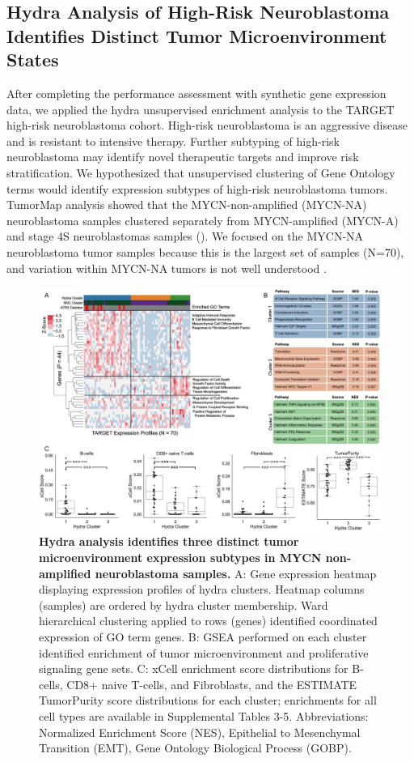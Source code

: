 \documentclass[10pt,letterpaper]{article}
\begin{document}
\subsection{Hydra Analysis of High-Risk Neuroblastoma Identifies Distinct Tumor Microenvironment States}
After completing the performance assessment with synthetic gene expression data, we applied the hydra unsupervised enrichment analysis to the TARGET high-risk neuroblastoma cohort. High-risk neuroblastoma is an aggressive disease and is resistant to intensive therapy. Further subtyping of high-risk neuroblastoma may identify novel therapeutic targets and improve risk stratification. We hypothesized that unsupervised clustering of Gene Ontology terms would identify expression subtypes of high-risk neuroblastoma tumors. TumorMap analysis showed that the MYCN-non-amplified (MYCN-NA) neuroblastoma samples clustered separately from MYCN-amplified (MYCN-A) and stage 4S neuroblastomas samples (). We focused on the MYCN-NA neuroblastoma tumor samples because this is the largest set of samples (N=70), and variation within MYCN-NA tumors is not well understood \cite{morgensternChallengeDefiningUltrahighrisk2019a}.

\begin{figure}[!h]
	\includegraphics[width=\textwidth]{img/MYCN-NA-Figure-V5@2x}
	\caption{{\bf Hydra analysis identifies three distinct tumor microenvironment expression subtypes in MYCN non-amplified neuroblastoma samples.}
		A: Gene expression heatmap displaying expression profiles of hydra clusters. Heatmap columns (samples) are ordered by hydra cluster membership. Ward hierarchical clustering applied to rows (genes) identified coordinated expression of GO term genes. B: GSEA performed on each cluster identified enrichment of tumor microenvironment and proliferative signaling gene sets. C: xCell enrichment score distributions for B-cells, CD8+ naive T-cells, and Fibroblasts, and the ESTIMATE TumorPurity score distributions for each cluster; enrichments for all cell types are available in Supplemental Tables 3-5. Abbreviations: Normalized Enrichment Score (NES), Epithelial to Mesenchymal Transition (EMT), Gene Ontology Biological Process (GOBP).
		\label{MYCN-NA}}
\end{figure}
\end{document}
